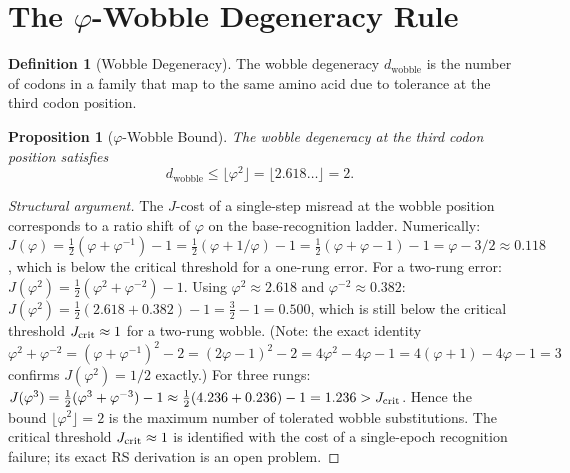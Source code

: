 \documentclass[12pt,a4paper]{article}
\newtheorem{proposition}[theorem]{Proposition}
\theoremstyle{definition}
\newtheorem{definition}[theorem]{Definition}
\theoremstyle{remark}
\begin{document}
\section{The $\varphi$-Wobble Degeneracy Rule}
\label{sec:wobble}

\begin{definition}[Wobble Degeneracy]
The wobble degeneracy $d_{\mathrm{wobble}}$ is the number of codons in
a family that map to the same amino acid due to tolerance at the third
codon position.
\end{definition}

\begin{proposition}[$\varphi$-Wobble Bound]
\label{thm:wobble}
The wobble degeneracy at the third codon position satisfies
\begin{equation}
  d_{\mathrm{wobble}} \leq \lfloor\varphi^2\rfloor = \lfloor 2.618
  \ldots\rfloor = 2.
\end{equation}
\end{proposition}

\begin{proof}[Structural argument]
The $J$-cost of a single-step misread at the wobble position
corresponds to a ratio shift of $\varphi$ on the base-recognition
ladder.  Numerically: $J(\varphi) = \tfrac{1}{2}(\varphi +
\varphi^{-1}) - 1 = \tfrac{1}{2}(\varphi + 1/\varphi) - 1 =
\tfrac{1}{2}(\varphi + \varphi - 1) - 1 = \varphi - 3/2
\approx 0.118$, which is below the critical threshold for a
one-rung error.  For a two-rung error: $J(\varphi^2) =
\tfrac{1}{2}(\varphi^2 + \varphi^{-2}) - 1$.  Using
$\varphi^2 \approx 2.618$ and $\varphi^{-2} \approx 0.382$:
$J(\varphi^2) = \tfrac{1}{2}(2.618 + 0.382) - 1
= \tfrac{3}{2} - 1 = 0.500$,
which is still below the critical threshold $J_{\rm crit} \approx 1$
for a two-rung wobble.  (Note: the exact identity
$\varphi^2 + \varphi^{-2} = (\varphi + \varphi^{-1})^2 - 2
= (2\varphi-1)^2 - 2 = 4\varphi^2 - 4\varphi - 1 = 4(\varphi+1) - 4\varphi - 1 = 3$
confirms $J(\varphi^2) = 1/2$ exactly.)  For three rungs: $J(\varphi^3)
= \tfrac{1}{2}(\varphi^3 + \varphi^{-3}) - 1 \approx
\tfrac{1}{2}(4.236 + 0.236) - 1 = 1.236 > J_{\rm crit}$.
Hence the bound $\lfloor\varphi^2\rfloor = 2$ is the maximum
number of tolerated wobble substitutions.  The critical
threshold $J_{\rm crit} \approx 1$ is identified with the
cost of a single-epoch recognition failure; its exact RS
derivation is an open problem.
\end{proof}
\end{document}
